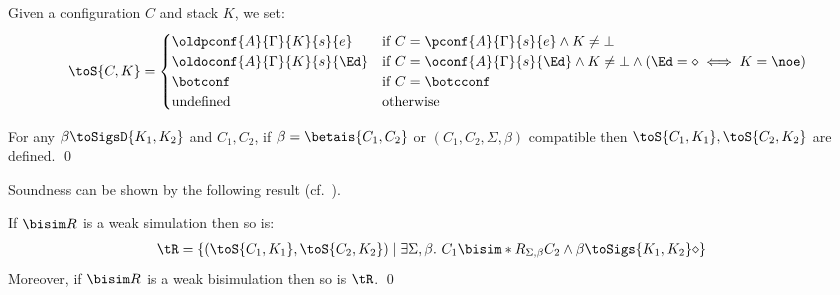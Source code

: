 \begin{definition}
Given a configuration $C$ and stack $K$, we set:
\[
  \toS{C,K} = \begin{cases}
    \oldpconf{A}{\Gamma}{K}{s}{e} &\text{if }C=\pconf{A}{\Gamma}{s}{e}\land K\not=\bot\\%
    \oldoconf{A}{\Gamma}{K}{s}{\Ed} &\text{if }C=\oconf{A}{\Gamma}{s}{\Ed}\land K\not=\bot %
    \land(\Ed=\diamond\iff K=\noe)\\
    \botconf &\text{if }C=\botcconf\\
    \text{undefined} &\text{otherwise}
    \end{cases}
  \]
\end{definition}


\begin{lemma}\label{lem:toS}
  For any $\beta\toSigsD{K_1,K_2}$ and $C_1,C_2$, if $\beta=\betais{C_1,C_2}$ or $(C_1,C_2,\Sigma,\beta)$ compatible
  then $\toS{C_1,K_1},\toS{C_2,K_2}$ are defined.
\qed\end{lemma}

Soundness can be shown by the following result (cf.~).
 

\begin{lemma}[Soundness]\label{lem:soundness}
  If $\bisim R$ is a weak simulation then so is:
  \begin{align*}
     \tR = \{
           (\toS{C_1,K_1},\toS{C_2,K_2}) \mid&\; %
                                                         \exists\Sigma,\beta.\
  C_1\bisim*{R}_{\Sigma,\beta}C_2
\land
                                                         \beta\toSigs{K_1,K_2}\diamond
\}
  \end{align*}
  Moreover, if $\bisim R$ is a weak bisimulation then so is $\tR$.
\qed\end{lemma}



